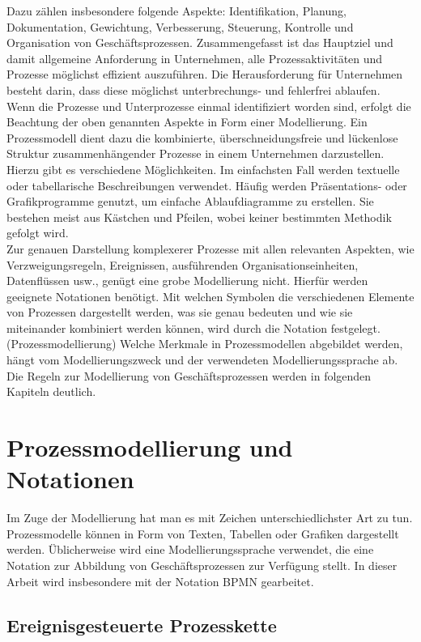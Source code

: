 Dazu zählen insbesondere folgende Aspekte:
Identifikation, Planung, Dokumentation,  Gewichtung, Verbesserung,
Steuerung, Kontrolle und Organisation von Geschäftsprozessen.
Zusammengefasst ist das Hauptziel und damit allgemeine Anforderung in Unternehmen, 
alle Prozessaktivitäten und Prozesse möglichst effizient auszuführen. 
Die Herausforderung für Unternehmen besteht darin, dass diese 
möglichst unterbrechungs- und fehlerfrei ablaufen.\\

Wenn die Prozesse und Unterprozesse einmal identifiziert worden sind, 
erfolgt die Beachtung der oben genannten Aspekte in Form einer Modellierung. 
Ein Prozessmodell dient dazu die kombinierte, überschneidungsfreie 
und lückenlose Struktur zusammenhängender Prozesse in einem Unternehmen darzustellen. 
Hierzu gibt es verschiedene Möglichkeiten. 
Im einfachsten Fall werden textuelle oder tabellarische Beschreibungen verwendet. 
Häufig werden Präsentations- oder Grafikprogramme genutzt, um einfache Ablaufdiagramme 
zu erstellen. Sie bestehen meist aus Kästchen und Pfeilen, wobei keiner 
bestimmten Methodik gefolgt wird.\\
Zur genauen Darstellung komplexerer Prozesse mit allen relevanten Aspekten, 
wie Verzweigungsregeln, 
Ereignissen, ausführenden Organisationseinheiten, Datenflüssen usw., 
genügt eine grobe Modellierung nicht. Hierfür werden geeignete Notationen benötigt. 
Mit welchen Symbolen die verschiedenen Elemente von Prozessen dargestellt werden, 
was sie genau bedeuten und wie sie miteinander kombiniert werden können, 
wird durch die Notation festgelegt. (Prozessmodellierung)
Welche Merkmale in Prozessmodellen abgebildet werden, hängt vom 
Modellierungszweck und der verwendeten Modellierungssprache ab. 
Die Regeln zur Modellierung von Geschäftsprozessen werden in folgenden Kapiteln deutlich.

\clearpage
\section{Prozessmodellierung und Notationen}

Im Zuge der Modellierung hat man es mit Zeichen unterschiedlichster Art zu tun.
Prozessmodelle können in Form von Texten, Tabellen oder Grafiken dargestellt werden. 
Üblicherweise wird eine Modellierungssprache verwendet, 
die eine Notation zur Abbildung von Geschäftsprozessen zur Verfügung stellt. 
In dieser Arbeit wird insbesondere mit der Notation BPMN gearbeitet.

\subsection{Ereignisgesteuerte Prozesskette}

